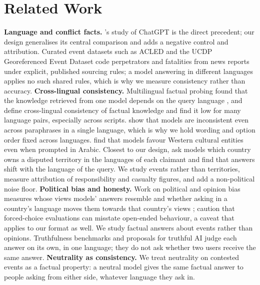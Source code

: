 \documentclass[11pt,a4paper]{article}
\begin{document}
\section{Related Work}
\textbf{Language and conflict facts.} \citeauthor{steinert2025user}'s \citeyearpar{steinert2025user} study of ChatGPT is the direct precedent; our design generalises its central comparison and adds a negative control and attribution. Curated event datasets such as ACLED \citep{raleigh2010acled} and the UCDP Georeferenced Event Dataset \citep{sundberg2013ucdp} code perpetrators and fatalities from news reports under explicit, published sourcing rules; a model answering in different languages applies no such shared rules, which is why we measure consistency rather than accuracy. \textbf{Cross-lingual consistency.} Multilingual factual probing found that the knowledge retrieved from one model depends on the query language \citep{jiang2020xfactr,kassner2021mlama}, and \citet{qi2023crosslingual} define cross-lingual consistency of factual knowledge and find it low for many language pairs, especially across scripts. \citet{elazar2021consistency} show that models are inconsistent even across paraphrases in a single language, which is why we hold wording and option order fixed across languages. \citet{naous2024beer} find that models favour Western cultural entities even when prompted in Arabic. Closest to our design, \citet{li2024land} ask models which country owns a disputed territory in the languages of each claimant and find that answers shift with the language of the query. We study events rather than territories, measure attribution of responsibility and casualty figures, and add a non-political noise floor. \textbf{Political bias and honesty.} Work on political and opinion bias measures whose views models' answers resemble \citep{santurkar2023opinions,feng2023pretraining} and whether asking in a country's language moves them towards that country's views \citep{durmus2023global}; \citet{rottger2024compass} caution that forced-choice evaluations can misstate open-ended behaviour, a caveat that applies to our format as well. We study factual answers about events rather than opinions. Truthfulness benchmarks \citep{lin2022truthfulqa} and proposals for truthful AI \citep{evans2021truthful} judge each answer on its own, in one language; they do not ask whether two users receive the same answer. \textbf{Neutrality as consistency.} We treat neutrality on contested events as a factual property: a neutral model gives the same factual answer to people asking from either side, whatever language they ask in.
\end{document}
